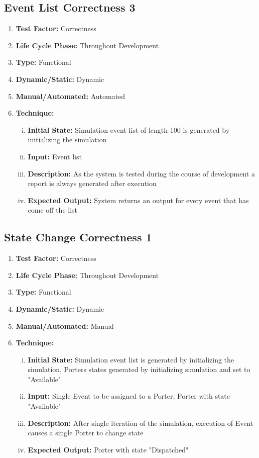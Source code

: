 \documentclass[paper=letter, fontsize=10pt]{scrartcl}
\numberwithin{equation}{section}		%
\numberwithin{figure}{section}			%
\numberwithin{table}{section}				%
\begin{document}
\subsection{Event List Correctness 3}
\begin{enumerate}[]
	\item \textbf{Test Factor:} Correctness
	\item \textbf{Life Cycle Phase:} Throughout Development
	\item \textbf{Type:} Functional
	\item \textbf{Dynamic/Static:} Dynamic
	\item \textbf{Manual/Automated:} Automated
	\item \textbf{Technique:} 
		\begin{enumerate}[(i)]
			\item \textbf{Initial State:} Simulation event list of length 100 is generated by initializing the simulation	
			\item \textbf{Input:} Event list
			\item \textbf{Description:} As the system is tested during the course of development a report is always generated after execution
			\item \textbf{Expected Output:} System returns an output for every event that has come off the list
		\end{enumerate}
\end{enumerate}

\subsection{State Change Correctness 1}
\begin{enumerate}[]
	\item \textbf{Test Factor:} Correctness
	\item \textbf{Life Cycle Phase:} Throughout Development
	\item \textbf{Type:} Functional
	\item \textbf{Dynamic/Static:} Dynamic
	\item \textbf{Manual/Automated:} Manual
	\item \textbf{Technique:}
		\begin{enumerate}[(i)]
			\item \textbf{Initial State:} Simulation event list is generated by initializing the simulation, Porters states generated by initializing simulation and set to "Available"
			\item \textbf{Input:} Single Event to be assigned to a Porter, Porter with state "Available"
			\item \textbf{Description:} After single iteration of the simulation, execution of Event causes a single Porter to change state
			\item \textbf{Expected Output:} Porter with state "Dispatched"
		\end{enumerate}
\end{enumerate}
\end{document}
